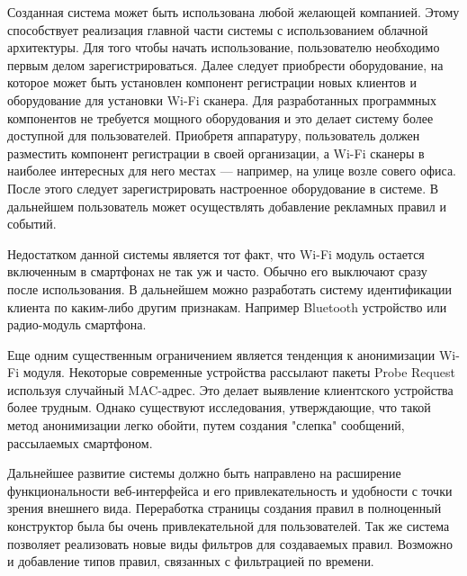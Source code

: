 Созданная система может быть использована любой желающей компанией. Этому способствует реализация главной части системы с использованием облачной архитектуры. Для того чтобы начать использование, пользователю необходимо первым делом зарегистрироваться. Далее следует приобрести оборудование, на которое может быть установлен компонент регистрации новых клиентов и оборудование для установки Wi-Fi сканера. Для разработанных программных компонентов не требуется мощного оборудования и это делает систему более доступной для пользователей. Приобретя аппаратуру, пользователь должен разместить компонент регистрации в своей организации, а Wi-Fi сканеры в наиболее интересных для него местах --- например, на улице возле совего офиса. После этого следует зарегистрировать настроенное оборудование в системе. В дальнейшем пользователь может осуществлять добавление рекламных правил и событий.

Недостатком данной системы является тот факт, что Wi-Fi модуль остается включенным в смартфонах не так уж и часто. Обычно его выключают сразу после использования. В дальнейшем можно разработать систему идентификации клиента по каким-либо другим признакам. Например Bluetooth устройство или радио-модуль смартфона.

Еще одним существенным ограничением является тенденция к анонимизации Wi-Fi модуля. Некоторые современные устройства рассылают пакеты Probe Request используя случайный MAC-адрес. Это делает выявление клиентского устройства более трудным. Однако существуют исследования, утверждающие, что такой метод анонимизации легко обойти, путем создания "слепка" сообщений, рассылаемых смартфоном.

Дальнейшее развитие системы должно быть направлено на расширение функциональности веб-интерфейса и его привлекательность и удобности с точки зрения внешнего вида. Переработка страницы создания правил в полноценный конструктор была бы очень привлекательной для пользователей. Так же система позволяет реализовать новые виды фильтров для создаваемых правил. Возможно и добавление типов правил, связанных с фильтрацией по времени. 